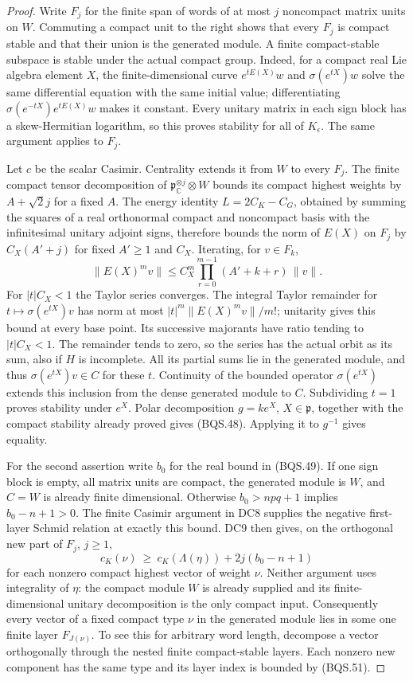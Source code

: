 \documentclass[11pt,a4paper]{article}
\numberwithin{equation}{section}
\theoremstyle{remark}\newtheorem{remark}[theorem]{Remark}
\begin{document}
\begin{proof}
Write $F_j$ for the finite span of words of at most $j$ noncompact
matrix units on $W$.  Commuting a compact unit to the right shows
that every $F_j$ is compact stable and that their union is the
generated module.  A finite compact-stable subspace is stable under
the actual compact group.  Indeed, for a compact real Lie algebra
element $X$, the finite-dimensional curve $e^{tE(X)}w$ and
$\sigma(e^{tX})w$ solve the same differential equation with the
same initial value; differentiating
$\sigma(e^{-tX})e^{tE(X)}w$ makes it constant.
Every unitary matrix in each sign block has a skew-Hermitian logarithm,
so this proves stability for all of $K_\epsilon$.
The same argument applies to $F_j$.

Let $c$ be the scalar Casimir.  Centrality extends it from $W$
to every $F_j$.  The finite compact tensor decomposition of
$\mathfrak p_{\mathbb C}^{\otimes j}\otimes W$ bounds its compact
highest weights by $A+\sqrt2j$ for a fixed $A$.
The energy identity
$L=2C_K-C_G$, obtained by summing the squares of a real orthonormal
compact and noncompact basis with the infinitesimal unitary adjoint
signs, therefore bounds the norm of $E(X)$ on $F_j$ by
$C_X(A'+j)$ for fixed $A'\ge1$ and $C_X$.
Iterating, for $v\in F_k$,
\[
 \|E(X)^m v\|
 \le C_X^m\prod_{r=0}^{m-1}(A'+k+r)\,\|v\|.
 \tag{BQS.50}
\]
For $|t|C_X<1$ the Taylor series converges.
The integral Taylor remainder for
$t\mapsto\sigma(e^{tX})v$ has norm at most
$|t|^m\|E(X)^m v\|/m!$; unitarity gives this bound at every
base point.  Its successive majorants have ratio tending to
$|t|C_X<1$.  The remainder tends to zero, so the series has
the actual orbit as its sum, also if $H$ is incomplete.
All its partial sums lie in the generated module, and thus
$\sigma(e^{tX})v\in C$ for these $t$.
Continuity of the bounded operator $\sigma(e^{tX})$ extends
this inclusion from the dense generated module to $C$.
Subdividing $t=1$ proves stability under $e^X$.
Polar decomposition $g=k e^X$, $X\in\mathfrak p$, together with
the compact stability already proved gives (BQS.48).
Applying it to $g^{-1}$ gives equality.

For the second assertion write $b_0$ for the real bound in
(BQS.49).  If one sign block is empty, all matrix units are compact,
the generated module is $W$, and $C=W$ is already finite dimensional.
Otherwise $b_0>npq+1$ implies $b_0-n+1>0$.
The finite Casimir argument in DC8 supplies the negative first-layer
Schmid relation at exactly this bound.  DC9 then gives, on the
orthogonal new part of $F_j$, $j\ge1$,
\[
 c_K(\nu)\ \ge\ c_K(\Lambda(\eta))
                         +2j(b_0-n+1)
 \tag{BQS.51}
\]
for each nonzero compact highest vector of weight $\nu$.
Neither argument uses integrality of $\eta$: the compact module
$W$ is already supplied and its finite-dimensional unitary
decomposition is the only compact input.
Consequently every vector of a fixed compact type $\nu$ in the
generated module lies in some one finite layer $F_{J(\nu)}$.
To see this for arbitrary word length, decompose a vector
orthogonally through the nested finite compact-stable layers.
Each nonzero new component has the same type and its layer index
is bounded by (BQS.51).


\end{proof}
\end{document}
